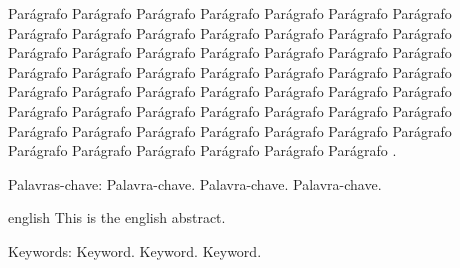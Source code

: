 
\setlength{\absparsep}{18pt} %
\begin{resumo}
 Parágrafo Parágrafo Parágrafo Parágrafo Parágrafo Parágrafo Parágrafo Parágrafo Parágrafo Parágrafo Parágrafo Parágrafo Parágrafo Parágrafo Parágrafo Parágrafo Parágrafo Parágrafo Parágrafo Parágrafo Parágrafo Parágrafo Parágrafo Parágrafo Parágrafo Parágrafo Parágrafo Parágrafo Parágrafo Parágrafo Parágrafo Parágrafo Parágrafo Parágrafo Parágrafo Parágrafo Parágrafo Parágrafo Parágrafo Parágrafo Parágrafo Parágrafo Parágrafo Parágrafo Parágrafo Parágrafo Parágrafo Parágrafo Parágrafo Parágrafo Parágrafo Parágrafo Parágrafo Parágrafo Parágrafo .

{Palavras-chave}: Palavra-chave. Palavra-chave. Palavra-chave.
\end{resumo}

\begin{resumo}[Abstract]
 \begin{otherlanguage*}{english}
   This is the english abstract.

   \vspace{\onelineskip}
 
   \noindent 
{Keywords}: Keyword. Keyword. Keyword.
 \end{otherlanguage*}
\end{resumo}


